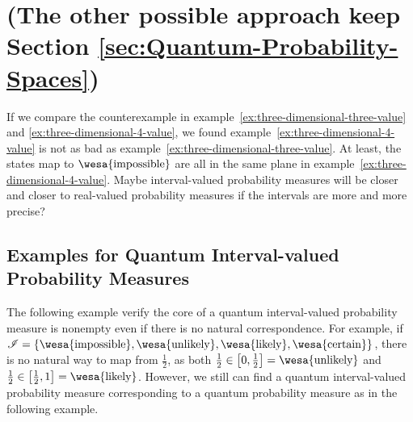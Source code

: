 \documentclass{article}
\theoremstyle{remark}
\newcommand{\imposs}{{\mbox{\wesa{impossible}}}}
\newcommand{\likely}{{\mbox{\wesa{likely}}}}
\newcommand{\unlikely}{{\mbox{\wesa{unlikely}}}}
\newcommand{\necess}{{\mbox{\wesa{certain}}}}
\begin{document}
\section{(The other possible approach keep Section \ref{sec:Quantum-Probability-Spaces}) }

If we compare the counterexample in example~\ref{ex:three-dimensional-three-value}
and \ref{ex:three-dimensional-4-value}, we found example~\ref{ex:three-dimensional-4-value}
is not as bad as example~\ref{ex:three-dimensional-three-value}.
At least, the states map to $\imposs$ are all in the same plane in
example~\ref{ex:three-dimensional-4-value}. Maybe interval-valued
probability measures will be closer and closer to real-valued probability
measures if the intervals are more and more precise?



\subsection{Examples for Quantum Interval-valued Probability Measures}

The following example verify the core of a quantum interval-valued
probability measure is nonempty even if there is no natural correspondence.
For example, if $\mathscr{I}=\left\{ \imposs,\unlikely,\likely,\necess\right\} $,
there is no natural way to map from $\frac{1}{2}$, as both $\frac{1}{2}\in\left[0,\frac{1}{2}\right]=\unlikely$
and $\frac{1}{2}\in\left[\frac{1}{2},1\right]=\likely$. However,
we still can find a quantum interval-valued probability measure corresponding
to a quantum probability measure as in the following example.
\end{document}
